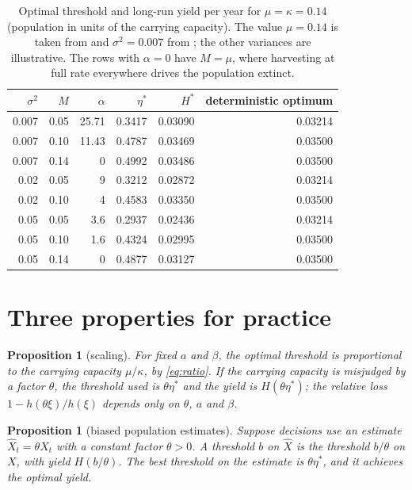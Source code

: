 \documentclass[11pt]{article}
\newtheorem{proposition}[theorem]{Proposition}
\theoremstyle{definition}
\begin{document}
\begin{table}[t]
\centering
\begin{tabular}{rrrrrr}
\toprule
$\sigma^2$ & $M$ & $\alpha$ & $\eta^*$ & $H^*$ & deterministic optimum\\
\midrule
0.007 & 0.05 & 25.71 & 0.3417 & 0.03090 & 0.03214\\
0.007 & 0.10 & 11.43 & 0.4787 & 0.03469 & 0.03500\\
0.007 & 0.14 & 0 & 0.4992 & 0.03486 & 0.03500\\
0.02 & 0.05 & 9 & 0.3212 & 0.02872 & 0.03214\\
0.02 & 0.10 & 4 & 0.4583 & 0.03350 & 0.03500\\
0.05 & 0.05 & 3.6 & 0.2937 & 0.02436 & 0.03214\\
0.05 & 0.10 & 1.6 & 0.4324 & 0.02995 & 0.03500\\
0.05 & 0.14 & 0 & 0.4877 & 0.03127 & 0.03500\\
\bottomrule
\end{tabular}
\caption{Optimal threshold and long-run yield per year for $\mu = \kappa = 0.14$ (population in units of the
carrying capacity). The value $\mu = 0.14$ is taken from \cite{saether02} and $\sigma^2 = 0.007$ from
\cite{kvalnes24}; the other variances are illustrative. The rows with $\alpha = 0$ have $M = \mu$, where
harvesting at full rate everywhere drives the population extinct.}
\label{tab:example}
\end{table}

\section{Three properties for practice}\label{sec:remarks}

\begin{proposition}[scaling]\label{prop:scale}
For fixed $a$ and $\beta$, the optimal threshold is proportional to the carrying capacity $\mu/\kappa$, by
\eqref{eq:ratio}. If the carrying capacity is misjudged by a factor $\theta$, the threshold used is
$\theta\eta^*$ and the yield is $H(\theta\eta^*)$; the relative loss $1 - h(\theta\xi)/h(\xi)$ depends only on
$\theta$, $a$ and $\beta$.
\end{proposition}

\begin{proposition}[biased population estimates]\label{prop:bias}
Suppose decisions use an estimate $\hat X_t = \theta X_t$ with a constant factor $\theta > 0$. A threshold $b$ on
$\hat X$ is the threshold $b/\theta$ on $X$, with yield $H(b/\theta)$. The best threshold on the estimate is
$\theta\eta^*$, and it achieves the optimal yield.
\end{proposition}
\end{document}
